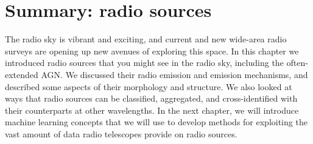 \section{Summary: radio sources}
\label{sec:summary-radio}
    
    The radio sky is vibrant and exciting, and current and new wide-area radio surveys are opening up new avenues of exploring this space. In this chapter we introduced radio sources that you might see in the radio sky, including the often-extended AGN. We discussed their radio emission and emission mechanisms, and described some aspects of their morphology and structure. We also looked at ways that radio sources can be classified, aggregated, and cross-identified with their counterparts at other wavelengths. In the next chapter, we will introduce machine learning concepts that we will use to develop methods for exploiting the vast amount of data radio telescopes provide on radio sources.

